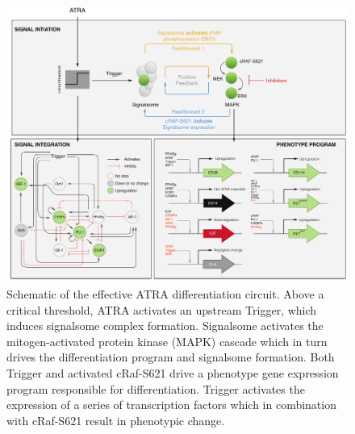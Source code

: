 \documentclass[12pt]{article}
\begin{document}
\begin{figure}[!t]
\includegraphics[width=1.0\textwidth]{./figs/Fig-1-Network_v3.pdf}
\caption{Schematic of the effective ATRA differentiation circuit.
Above a critical threshold, ATRA activates an upstream Trigger, which induces signalsome complex formation.
Signalsome activates the mitogen-activated protein kinase (MAPK) cascade which in turn
drives the differentiation program and signalsome formation.
Both Trigger and activated cRaf-S621 drive a phenotype gene expression program responsible for differentiation.
Trigger activates the expression of a series of transcription factors which in combination with cRaf-S621 result in phenotypic change.}\label{fig:network}
\end{figure}
\end{document}

